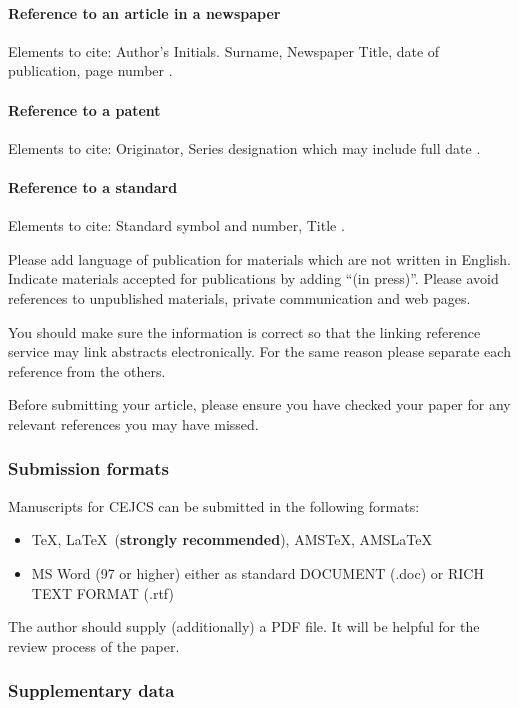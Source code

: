 \documentclass[CEJCS,PDF]{cej} %
\begin{document}
\paragraph{Reference to an article in a newspaper}
Elements to cite:
Author's Initials. Surname,
Newspaper Title,
date of publication,
page number \cite{newspaper-1,newspaper-2}.


\paragraph{Reference to a patent}
Elements to cite:
Originator,
Series designation which may include full date \cite{patent}.


\paragraph{Reference to a standard}
Elements to cite:
Standard symbol and number,
Title \cite{standard-1,standard-2}.

Please add language of publication for materials which are not written in English. Indicate materials accepted for publications by adding ``(in press)''. Please avoid references to unpublished materials, private communication and web pages.

You should make sure the information is correct so that the linking reference service may link abstracts electronically. For the same reason please separate each reference from the others.

Before submitting your article, please ensure you have checked your paper for any relevant references you may have missed.

\subsubsection{Submission formats}

Manuscripts for CEJCS can be submitted in the following formats:
\begin{itemize}
 \item \TeX, \LaTeX ~({\bf strongly  recommended}), AMSTeX,  AMSLaTeX
\item MS Word (97 or higher) either as standard DOCUMENT (.doc) or RICH TEXT FORMAT (.rtf)
\end{itemize}

The author should supply (additionally) a PDF file. It will be helpful for the review process of the paper.

\subsubsection{Supplementary data}
\end{document}

